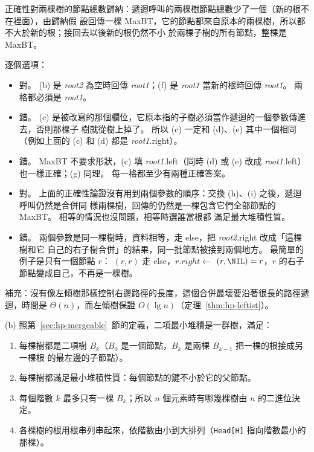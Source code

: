 正確性對兩棵樹的節點總數歸納：遞迴呼叫的兩棵樹節點總數少了一個（新的根不在裡面），由歸納假
設回傳一棵 MaxBT，它的節點都來自原本的兩棵樹，所以都不大於新的根；接回去以後新的根仍然不小
於兩棵子樹的所有節點，整棵是 MaxBT。

逐個選項：
\begin{itemize}
\item[A.] 對。 (b) 是 \emph{root2} 為空時回傳 \emph{root1}；(f) 是 \emph{root1} 當新的根時回傳
\emph{root1}。 兩格都必須是 \emph{root1}。
\item[B.] 錯。 (c) 是被改寫的那個欄位，它原本指的子樹必須當作遞迴的一個參數傳進去，否則那棵子
樹就從樹上掉了。 所以 (c) 一定和 (d)、(e) 其中一個相同（例如上面的 (c) 和 (d) 都是
\emph{root1}.right）。
\item[C.] 錯。 MaxBT 不要求形狀，(c) 填 \emph{root1}.left（同時 (d) 或 (e) 改成
\emph{root1}.left）也一樣正確；(g) 同理。 每一格都至少有兩種正確答案。
\item[D.] 對。 上面的正確性論證沒有用到兩個參數的順序：交換 (h)、(i) 之後，遞迴呼叫仍然是合併同
樣兩棵樹，回傳的仍然是一棵包含它們全部節點的 MaxBT。 相等的情況也沒問題，相等時選誰當根都
滿足最大堆積性質。
\item[E.] 錯。 兩個參數是同一棵樹時，資料相等，走 else，把 \emph{root2}.right 改成「這棵樹和它
自己的右子樹合併」的結果，同一批節點被接到兩個地方。 最簡單的例子是只有一個節點 $r$：
$(r, r)$ 走 else，$r.\mathit{right} \gets$
$(r, \NIL) = r$，$r$ 的右子節點變成自己，不再是一棵樹。
\end{itemize}

補充：沒有像左傾樹那樣控制右邊路徑的長度，這個合併最壞要沿著很長的路徑遞迴，時間是
$\Theta(n)$，而左傾樹保證 $O(\lg n)$（定理~\ref{thm:hp-leftist}）。

(b) 照第~\ref{sec:hp-mergeable}~節的定義，二項最小堆積是一群樹，滿足：
\begin{enumerate}
\item 每棵樹都是二項樹 $B_k$（$B_0$ 是一個節點，$B_k$ 是兩棵 $B_{k-1}$ 把一棵的根接成另一棵根
的最左邊的子節點）。
\item 每棵樹都滿足最小堆積性質：每個節點的鍵不小於它的父節點。
\item 每個階數 $k$ 最多只有一棵 $B_k$；所以 $n$ 個元素時有哪幾棵樹由 $n$ 的二進位決定。
\item 各棵樹的根用根串列串起來，依階數由小到大排列（\texttt{Head[H]} 指向階數最小的那棵）。
\end{enumerate}

